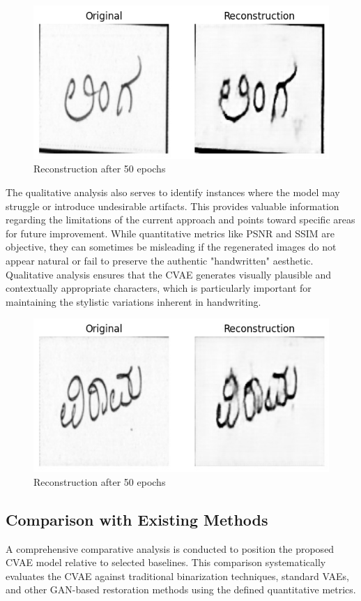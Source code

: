 \documentclass[conference]{IEEEtran}
\begin{document}
\begin{figure}[htbp]
    \centering
    \includegraphics[width=\columnwidth]{word1.png} %
    \caption{Reconstruction after 50 epochs}
    \label{fig:single_column_image}
\end{figure}
The qualitative analysis also serves to identify instances where the model may struggle or introduce undesirable artifacts. This provides valuable information regarding the limitations of the current approach and points toward specific areas for future improvement. While quantitative metrics like PSNR and SSIM are objective, they can sometimes be misleading if the regenerated images do not appear natural or fail to preserve the authentic "handwritten" aesthetic. Qualitative analysis ensures that the CVAE generates visually plausible and contextually appropriate characters, which is particularly important for maintaining the stylistic variations inherent in handwriting.
\begin{figure}[htbp]
    \centering
    \includegraphics[width=\columnwidth]{word2.png} %
    \caption{Reconstruction after 50 epochs}
    \label{fig:single_column_image}
\end{figure}
\subsection{Comparison with Existing Methods}
\justify
A comprehensive comparative analysis is conducted to position the proposed CVAE model relative to selected baselines. This comparison systematically evaluates the CVAE against traditional binarization techniques, standard VAEs, and other GAN-based restoration methods using the defined quantitative metrics.
\end{document}
